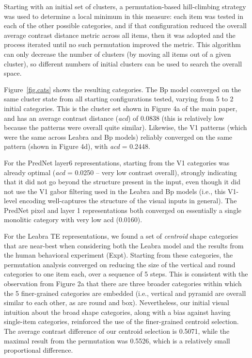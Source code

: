 \documentclass[12pt,twoside]{article}
\newif\myifpdf
\begin{document}
Starting with an initial set of clusters, a permutation-based hill-climbing strategy was used to determine a local minimum in this measure: each item was tested in each of the other possible categories, and if that configuration reduced the overall average contrast distance metric across all items, then it was adopted and the process iterated until no such permutation improved the metric.  This algorithm can only decrease the number of clusters (by moving all items out of a given cluster), so different numbers of initial clusters can be used to search the overall space.

Figure~\ref{fig.cats} shows the resulting categories. The Bp model converged on the same cluster state from all starting configurations tested, varying from 5 to 2 initial categories.  This is the cluster set shown in Figure 4a of the main paper, and has an average contrast distance ({\em acd}) of 0.0838 (this is relatively low because the patterns were overall quite similar).  Likewise, the V1 patterns (which were the same across Leabra and Bp models) reliably converged on the same pattern (shown in Figure 4d), with {\em acd} = 0.2448.

For the PredNet layer6 representations, starting from the V1 categories was already optimal ({\em acd} = 0.0250 -- very low contrast overall), strongly indicating that it did not go beyond the structure present in the input, even though it did not use the V1 gabor filtering used in the Leabra and Bp models (i.e., this V1-level encoding well-captures the structure of the visual inputs in general).  The PredNet pixel and layer 1 representations both converged on essentially a single monolitic category with very low acd (0.0160).


For the Leabra TE representations, we found a set of {\em centroid} shape categories that are near-best when considering both the Leabra model and the results from the human behavioral experiment (Expt).  Starting from these  categories, the permutation analysis converged on reducing the size of the vertical and round categories to one item each, over a sequence of 5 steps.  This is consistent with the observation from Figure 2a that there are three broader categories within which the 5 finer-grained categories are embedded (i.e., vertical and pyramid are overall similar to each other, as are round and box).  Nevertheless, our initial visual intuition about the broad shape categories, along with a bias against having single-item categories, reinforced the use of the finer-grained centroid selection.  The average contrast difference of our centroid selection is 0.5071, while the maximal result from the permutation was 0.5526, which is a relatively small proportional difference.
\end{document}
